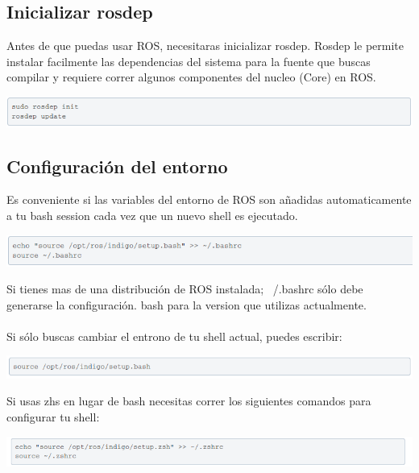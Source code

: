 \documentclass[a4paper]{book}
\begin{document}
\subsection{Inicializar rosdep}
Antes de que puedas usar ROS, necesitaras inicializar rosdep. Rosdep le permite instalar facilmente las dependencias 
del sistema para la fuente que buscas compilar y requiere correr algunos componentes del nucleo (Core) en ROS.

\begin{center}
\includegraphics[width=1\textwidth]{Figures/Software/Install_ROS/Paso_13.png}
\end{center}

\subsection{Configuración del entorno}

Es conveniente si las variables del entorno de ROS son añadidas automaticamente a tu bash session cada vez que un 
nuevo shell es ejecutado. 

\begin{center}
\includegraphics[width=1\textwidth]{Figures/Software/Install_ROS/Paso_14.png}
\end{center}

Si tienes mas de una distribución de ROS instalada; ~/.bashrc sólo debe generarse la configuración. bash para 
la version que utilizas actualmente.\\
\\
Si sólo buscas cambiar el entrono de tu shell actual, puedes escribir:

\begin{center}
\includegraphics[width=1\textwidth]{Figures/Software/Install_ROS/Paso_15.png}
\end{center}

Si usas zhs en lugar de bash necesitas correr los siguientes comandos para configurar tu shell:

\begin{center}
\includegraphics[width=1\textwidth]{Figures/Software/Install_ROS/Paso_16.png}
\end{center}
\end{document}
